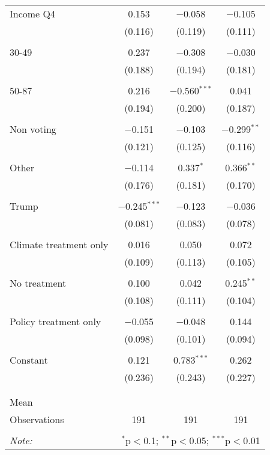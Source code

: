 \begin{tabular}{@{\extracolsep{5pt}}lccc}
 Income Q4 & 0.153 & $-$0.058 & $-$0.105 \\ 
  & (0.116) & (0.119) & (0.111) \\ 
  & & & \\ 
 30-49 & 0.237 & $-$0.308 & $-$0.030 \\ 
  & (0.188) & (0.194) & (0.181) \\ 
  & & & \\ 
 50-87 & 0.216 & $-$0.560$^{***}$ & 0.041 \\ 
  & (0.194) & (0.200) & (0.187) \\ 
  & & & \\ 
 Non voting & $-$0.151 & $-$0.103 & $-$0.299$^{**}$ \\ 
  & (0.121) & (0.125) & (0.116) \\ 
  & & & \\ 
 Other & $-$0.114 & 0.337$^{*}$ & 0.366$^{**}$ \\ 
  & (0.176) & (0.181) & (0.170) \\ 
  & & & \\ 
 Trump & $-$0.245$^{***}$ & $-$0.123 & $-$0.036 \\ 
  & (0.081) & (0.083) & (0.078) \\ 
  & & & \\ 
 Climate treatment only & 0.016 & 0.050 & 0.072 \\ 
  & (0.109) & (0.113) & (0.105) \\ 
  & & & \\ 
 No treatment & 0.100 & 0.042 & 0.245$^{**}$ \\ 
  & (0.108) & (0.111) & (0.104) \\ 
  & & & \\ 
 Policy treatment only & $-$0.055 & $-$0.048 & 0.144 \\ 
  & (0.098) & (0.101) & (0.094) \\ 
  & & & \\ 
 Constant & 0.121 & 0.783$^{***}$ & 0.262 \\ 
  & (0.236) & (0.243) & (0.227) \\ 
  & & & \\ 
\hline \\[-1.8ex] 
Mean &  &  &  \\ 
Observations & 191 & 191 & 191 \\ 
\hline 
\hline \\[-1.8ex] 
\textit{Note:}  & \multicolumn{3}{r}{$^{*}$p$<$0.1; $^{**}$p$<$0.05; $^{***}$p$<$0.01} \\ 
\end{tabular} 
